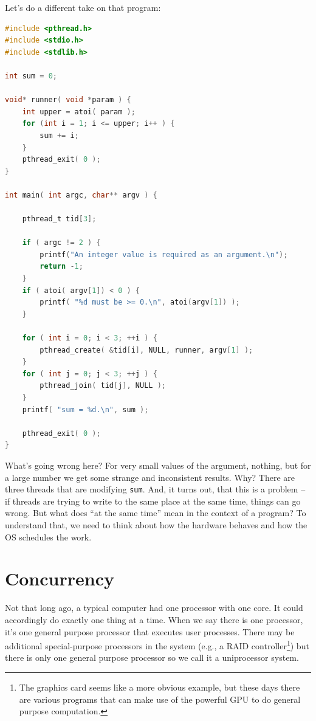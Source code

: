 Let's do a different take on that program:

\begin{lstlisting}[language=C]
#include <pthread.h>
#include <stdio.h>
#include <stdlib.h>

int sum = 0;

void* runner( void *param ) {
    int upper = atoi( param );
    for (int i = 1; i <= upper; i++ ) {
        sum += i;
    }
    pthread_exit( 0 );
}

int main( int argc, char** argv ) {

    pthread_t tid[3];

    if ( argc != 2 ) {
        printf("An integer value is required as an argument.\n");
        return -1;
    }
    if ( atoi( argv[1]) < 0 ) {
        printf( "%d must be >= 0.\n", atoi(argv[1]) );
    }

    for ( int i = 0; i < 3; ++i ) {
        pthread_create( &tid[i], NULL, runner, argv[1] );
    }
    for ( int j = 0; j < 3; ++j ) {
        pthread_join( tid[j], NULL );
    }
    printf( "sum = %d.\n", sum );

    pthread_exit( 0 );
}
\end{lstlisting}

What's going wrong here? For very small values of the argument, nothing, but for a large number we get some strange and inconsistent results. Why? There are three threads that are modifying \texttt{sum}. And, it turns out, that this is a problem -- if threads are trying to write to the same place at the same time, things can go wrong. But what does ``at the same time'' mean in the context of a program? To understand that, we need to think about how the hardware behaves and how the OS schedules the work.

\section*{Concurrency}

Not that long ago, a typical computer had one processor with one core. It could accordingly do exactly one thing at a time. When we say there is one processor, it's one general purpose processor that executes user processes. There may be additional special-purpose processors in the system (e.g., a RAID controller\footnote{The graphics card seems like a more obvious example, but these days there are various programs that can make use of the powerful GPU to do general purpose computation.}) but there is only one general purpose processor so we call it a uniprocessor system.


